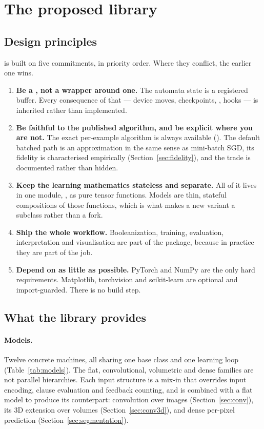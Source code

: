 \section{The proposed library}
\label{sec:library}

\subsection{Design principles}

\ttlibname is built on five commitments, in priority order. Where they conflict, the earlier
one wins.

\begin{enumerate}[leftmargin=1.4em, itemsep=0.35em, topsep=0.35em]
  \item \textbf{Be a , not a wrapper around one.}
    The automata state is a registered buffer. Every consequence of that --- device moves,
    checkpoints, , hooks --- is inherited rather than implemented.
  \item \textbf{Be faithful to the published algorithm, and be explicit where you are not.}
    The exact per-example algorithm is always available
    (). The default batched path is an approximation in the
    same sense as mini-batch SGD, its fidelity is characterised empirically
    (Section~\ref{sec:fidelity}), and the trade is documented rather than hidden.
  \item \textbf{Keep the learning mathematics stateless and separate.}
    All of it lives in one module, , as pure tensor functions. Models are
    thin, stateful compositions of those functions, which is what makes a new variant a
    subclass rather than a fork.
  \item \textbf{Ship the whole workflow.}
    Booleanization, training, evaluation, interpretation and visualisation are part of the
    package, because in practice they are part of the job.
  \item \textbf{Depend on as little as possible.}
    PyTorch and NumPy are the only hard requirements. Matplotlib, torchvision and
    scikit-learn are optional and import-guarded. There is no build step.
\end{enumerate}

\subsection{What the library provides}

\paragraph{Models.}
Twelve concrete machines, all sharing one base class and one learning loop
(Table~\ref{tab:models}). The flat, convolutional, volumetric and dense families are not
parallel hierarchies. Each input structure is a mix-in that overrides input encoding, clause
evaluation and feedback counting, and is combined with a flat model to produce its
counterpart: convolution over images (Section~\ref{sec:conv}), its 3D extension over
volumes (Section~\ref{sec:conv3d}), and dense per-pixel prediction
(Section~\ref{sec:segmentation}).


